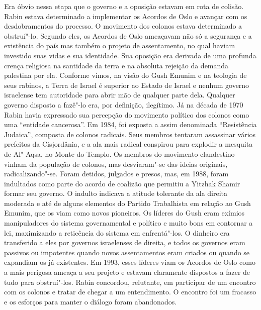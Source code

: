 Era óbvio nessa etapa que o governo e a oposição estavam em rota de
colisão. Rabin estava determinado a implementar os Acordos de Oslo e
avançar com os desdobramentos do processo. O movimento dos colonos
estava determinado a obstruí"-lo. Segundo eles, os Acordos de Oslo
ameaçavam não só a segurança e a existência do país mas também o
projeto de assentamento, no qual haviam investido suas vidas e sua
identidade. Sua oposição era derivada de uma profunda crença religiosa
na santidade da terra e na absoluta rejeição da demanda palestina por
ela. Conforme vimos, na visão do Gush Emunim e na teologia de seus
rabinos, a Terra de Israel é superior ao Estado de Israel e nenhum
governo israelense tem autoridade para abrir mão de qualquer parte dela.
Qualquer governo disposto a fazê"-lo era, por definição, ilegítimo. Já na
década de 1970 Rabin havia expressado sua percepção do movimento
político dos colonos como uma ``entidade cancerosa''. Em 1984, foi
exposta a assim denominada ``Resistência Judaica'', composta de colonos
radicais. Seus membros tentaram assassinar vários prefeitos da
Cisjordânia, e a ala mais radical conspirou para explodir a mesquita de
Al"-Aqsa, no Monte do Templo. Os membros do movimento clandestino vinham
da população de colonos, mas desviaram"-se das ideias originais,
radicalizando"-se. Foram detidos, julgados e presos, mas, em
1988, foram indultados como parte do acordo de coalizão que permitiu a
Yitzhak Shamir formar seu governo. O indulto indicava a atitude
tolerante da ala direita moderada e até de alguns elementos do Partido
Trabalhista em relação ao Gush Emunim, que os viam como novos pioneiros.
Os líderes do Gush eram exímios manipuladores do sistema governamental e
político e muito bons em contornar a lei, maximizando a reticência do sistema em
enfrentá"-los. O dinheiro era transferido a eles por governos israelenses
de direita, e todos os governos eram passivos ou impotentes quando
novos assentamentos eram criados ou quando se expandiam os já existentes. Em 1993,
esses líderes viam os Acordos de Oslo como a mais perigosa ameaça a seu
projeto e estavam claramente dispostos a fazer de tudo para obstruí"-los.
Rabin concordou, relutante, em participar de um encontro com os colonos
e tratar de chegar a um entendimento. O encontro foi um fracasso e os
esforços para manter o diálogo foram abandonados.

